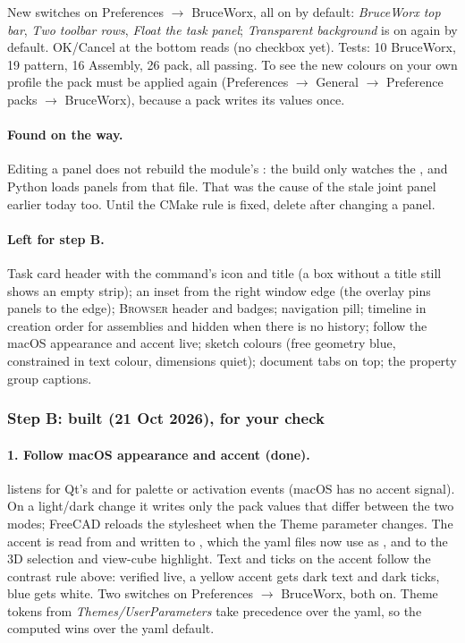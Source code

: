 New switches on Preferences $\rightarrow$ BruceWorx, all on by default: \emph{BruceWorx top bar}, \emph{Two
toolbar rows}, \emph{Float the task panel}; \emph{Transparent background} is on again by default. OK/Cancel at the
bottom reads  (no checkbox yet). Tests: 10 BruceWorx, 19 pattern, 16 Assembly, 26 pack, all passing.
To see the new colours on your own profile the pack must be applied again (Preferences $\rightarrow$ General
$\rightarrow$ Preference packs $\rightarrow$ BruceWorx), because a pack writes its values once.

\paragraph{Found on the way.} Editing a  panel does not rebuild the module's : the build
only watches the , and Python loads panels from that file. That was the cause of the stale joint
panel earlier today too. Until the CMake rule is fixed, delete 
after changing a panel.

\paragraph{Left for step B.} Task card header with the command's icon and title (a box without a title still
shows an empty strip); an inset from the right window edge (the overlay pins panels to the edge);
\textsc{Browser} header and badges; navigation pill; timeline in creation order for assemblies and hidden when
there is no history; follow the macOS appearance and accent live; sketch colours (free geometry blue,
constrained in text colour, dimensions quiet); document tabs on top; the property group captions.

\subsubsection*{Step B: built (21 Oct 2026), for your check}

\paragraph{1. Follow macOS appearance and accent (done).}  listens for Qt's
 and for palette or activation events (macOS has no accent signal). On a light/dark
change it writes only the pack values that differ between the two modes; FreeCAD reloads the stylesheet when the
Theme parameter changes. The accent is read from  and written to
, which the yaml files now use as , and to the 3D selection and
view-cube highlight. Text and ticks on the accent follow the contrast rule above: verified live, a yellow
accent gets dark text and dark ticks, blue gets white. Two switches on Preferences $\rightarrow$ BruceWorx, both on.
Theme tokens from \emph{Themes/UserParameters} take precedence over the yaml, so the computed
 wins over the yaml default.

